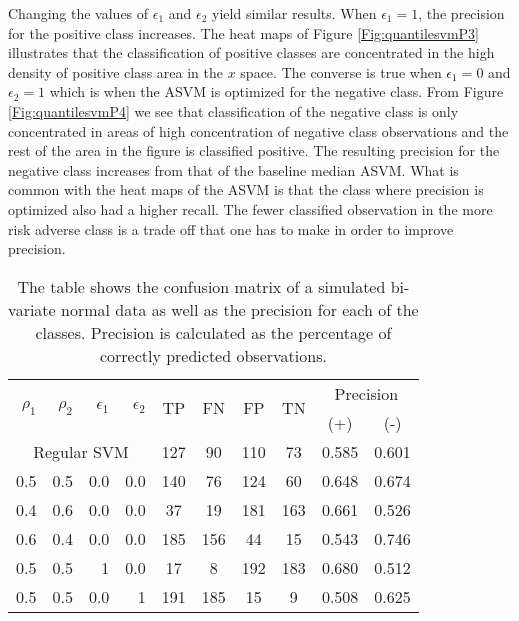 \documentclass[twoside,11pt]{article}
\begin{document}
Changing the values of $\epsilon_1$ and $\epsilon_2$ yield similar results. When $\epsilon_1=1$, the precision for the positive class increases. The heat maps of Figure \ref{Fig:quantilesvmP3} illustrates that the classification of positive classes are concentrated in the high density of positive class area in the $x$ space. The converse is true when $\epsilon_1=0$ and $\epsilon_2=1$ which is when the ASVM is optimized for the negative class. From Figure \ref{Fig:quantilesvmP4} we see that classification of the negative class is only concentrated in areas of high concentration of negative class observations and the rest of the area in the figure is classified positive. The resulting precision for the negative class increases from that of the baseline median ASVM. What is common with the heat maps of the ASVM is that the class where precision is optimized also had a higher recall. The fewer classified observation in the more risk adverse class is a trade off that one has to make in order to improve precision.

\begin{table}[htp]\label{simulatedsvmtable}

\begin{tabular}{rrrr|cccccc}

\hline
 \multirow{2}{*}{$\rho_1$} & \multirow{2}{*}{$\rho_2$} & \multirow{2}{*}{$\epsilon_1$} & \multirow{2}{*}{$\epsilon_2$} & \multirow{2}{*}{TP}    & \multirow{2}{*}{FN}    & \multirow{2}{*}{FP}    & \multirow{2}{*}{TN} & \multicolumn{2}{c}{Precision} \\
    &&&&&&&&  (+) &  (-) \\

\hline
\hline
\multicolumn{4}{c|}{Regular SVM} &        127 &         90 &        110 &         73 &      0.585 &      0.601 \\

0.5   & 0.5   & 0.0   & 0.0 &        140 &         76 &        124 &         60 &      0.648 &      0.674 \\

0.4   & 0.6   & 0.0   & 0.0 &         37 &         19 &        181 &        163 &      0.661 &      0.526 \\

0.6   & 0.4   & 0.0   & 0.0 &        185 &        156 &         44 &         15 &      0.543 &      0.746 \\

0.5   & 0.5   & 1   & 0.0 &         17 &          8 &        192 &        183 &      0.680 &      0.512 \\

0.5   & 0.5   & 0.0   & 1 &        191 &        185 &         15 &          9 &      0.508 &      0.625 \\
\hline
\hline
\end{tabular}
\caption{The table shows the confusion matrix of a simulated bi-variate normal data as well as the precision for each of the classes. Precision is calculated as the percentage of correctly predicted observations.}
\end{table}
\end{document}
